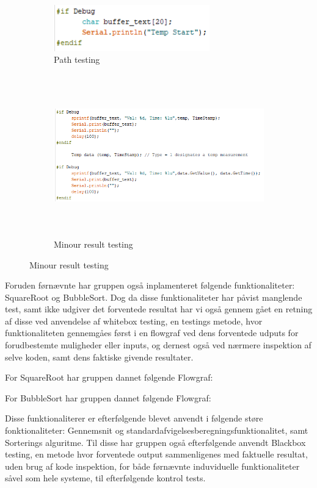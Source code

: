 \documentclass[11pt]{article}
\begin{document}
    \begin{figure}[H]
        \begin{subfigure}{0.3\textwidth}
            \centering
            \includegraphics[width=1\linewidth, height=2cm]{Struktureret_System_Udvikling/Workshop_3/Assets/Start.PNG}
            \caption{Path testing}
            \label{fig:TestPath}
        \end{subfigure}
        \begin{subfigure}{0.7\textwidth}
            \centering
            \includegraphics[width=1\linewidth, height=7cm]{Struktureret_System_Udvikling/Workshop_3/Assets/Secound.PNG}
            \caption{Minour result testing}
            \label{fig:TestRes}
        \end{subfigure}
        \label{fig:Testing}
    \end{figure}
    
    
    Foruden førnævnte har gruppen også inplamenteret følgende funktionaliteter:
    SquareRoot og BubbleSort.
    Dog da disse funktionaliteter har påvist manglende test, samt ikke udgiver det forventede resultat har vi også gennem gået en retning af disse ved anvendelse af whitebox testing, en testings metode, hvor funktionaliteten gennemgåes først i en flowgraf ved dens forventede udputs for forudbestemte muligheder eller inputs, og dernest også ved nærmere inspektion af selve koden, samt dens faktiske givende resultater.
    
    For SquareRoot har gruppen dannet følgende Flowgraf:

    For BubbleSort har gruppen dannet følgende Flowgraf:

    Disse funktionaliterer er efterfølgende blevet anvendt i følgende støre fonktionaliteter:
    Gennemsnit og standardafvigelsesberegningsfunktionalitet,
    samt Sorterings alguritme.
    Til disse har gruppen også efterfølgende anvendt Blackbox testing, en metode hvor forventede output sammenligenes med faktuelle resultat, uden brug af kode inspektion, for både førnævnte induviduelle funktionaliteter såvel som hele systeme, til efterfølgende kontrol tests.
    
\end{document}
